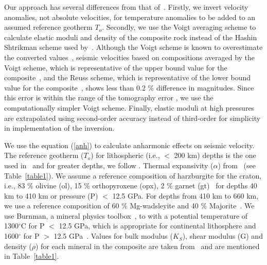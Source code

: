 \documentclass[draft,linenumbers]{agujournal2018}
\begin{document}
Our approach has several differences from that of~\citet{Cammarano2003}. Firstly, we invert velocity anomalies, not absolute velocities, for temperature anomalies to be added to an assumed reference geotherm $T_o$. Secondly, we use the Voigt averaging scheme to calculate elastic moduli and density of the composite rock instead of the Hashin Shtrikman scheme used by~\citet{Cammarano2003}. Although the Voigt scheme is known to overestimate the converted values~\citep{watt_1976}, seismic velocities based on compositions averaged by the Voigt scheme, which is representative of the upper bound value for the composite~\citep{watt_1976}, and the Reuss scheme, which is representative of the  lower bound value for the composite~\citep{watt_1976}, shows less than 0.2 \% difference in magnitudes. Since this error is within the range of the tomography error \citep{Biryol_2016}, we use the computationally simpler Voigt scheme. Finally, elastic moduli at high pressures are extrapolated using second-order accuracy instead of third-order for simplicity in implementation of the inversion.

We use the equation (\ref{anh}) to calculate anharmonic effects on seismic velocity.  The reference geotherm ($T_o$) for lithospheric (i.e., $<$ 200 km) depths is the one used in~\citep{Goes_2002} and for greater depths, we follow \citet{turcotte2014geodynamics}. Thermal expansivity ($\alpha$) from~\citet{saxena_data} (see Table~\ref{table1}). We assume a reference composition of harzburgite for the craton, i.e., 83 \% olivine (ol), 15 \% orthopyroxene (opx), 2 \% garnet (gt)~\citep{mcdonough1998mineralogy} for depths 40 km to 410 km or pressure (P) $<$ 12.5 GPa. For depths from 410 km to 660 km, we use a reference composition of 60 \% Mg-wadsleyite and 40 \% Majorite~\citep{haggerty1995upper}. We use Burnman, a mineral physics toolbox~\citep{cottaar2014burnman}, to   with a potential temperature of 1300$^{\circ}$C for P $<$ 12.5 GPa, which is appropriate for continental lithosphere \citep{rudnick1998thermal} and 1600$^{\circ}$ for P $>$ 12.5 GPa~\citep{katsura2010adiabatic}. Values for bulk modulus ($K_S$), shear modulus (G) and density ($\rho$) for each mineral in the composite are taken from~\citet{Cammarano2003} and are mentioned in Table~\ref{table1}.
\end{document}
